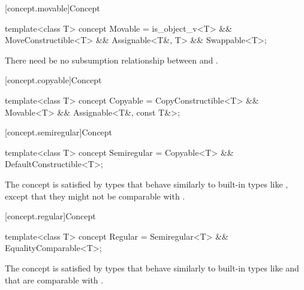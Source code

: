 [concept.movable]{Concept }

%
\begin{itemdecl}
template<class T>
  concept Movable = is_object_v<T> && MoveConstructible<T> && Assignable<T&, T> && Swappable<T>;
\end{itemdecl}

\begin{itemdescr}
\pnum
There need be no subsumption relationship between
and
.
\end{itemdescr}

[concept.copyable]{Concept }

%
\begin{itemdecl}
template<class T>
  concept Copyable = CopyConstructible<T> && Movable<T> && Assignable<T&, const T&>;
\end{itemdecl}

[concept.semiregular]{Concept }

%
\begin{itemdecl}
template<class T>
  concept Semiregular = Copyable<T> && DefaultConstructible<T>;
\end{itemdecl}

\begin{itemdescr}
\pnum
\begin{note}
The  concept is satisfied by types that behave similarly
to built-in types like , except that they might not
be comparable with \tcode{==}.
\end{note}
\end{itemdescr}

[concept.regular]{Concept }

%
\begin{itemdecl}
template<class T>
  concept Regular = Semiregular<T> && EqualityComparable<T>;
\end{itemdecl}

\begin{itemdescr}
\pnum
\begin{note}
The  concept is satisfied by types that behave similarly to
built-in types like  and that are comparable with
\tcode{==}.
\end{note}
\end{itemdescr}

